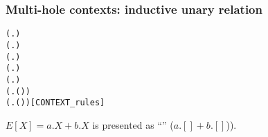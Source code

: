 \begin{frame}[fragile]
\frametitle{Multi-hole contexts: inductive unary relation}
\vspace{-2ex}
\begin{definition}
\begin{small}
\begin{alltt}
 (\HOLTokenLambda{}. )
 (\HOLTokenLambda{}. )
  \HOLSymConst{\HOLTokenImp{}}  (\HOLTokenLambda{}.  )
  \HOLSymConst{\HOLTokenConj{}}   \HOLSymConst{\HOLTokenImp{}}  (\HOLTokenLambda{}.   \HOLSymConst{\ensuremath{+}}  )
  \HOLSymConst{\HOLTokenConj{}}   \HOLSymConst{\HOLTokenImp{}}  (\HOLTokenLambda{}.   \HOLSymConst{\ensuremath{\parallel}}  )
  \HOLSymConst{\HOLTokenImp{}}  (\HOLTokenLambda{}. \HOLSymConst{\ensuremath{\nu}}  ( ))
  \HOLSymConst{\HOLTokenImp{}}  (\HOLTokenLambda{}.  ( ) )\hfill{[CONTEXT_rules]}
\end{alltt}
\end{small}
\end{definition}
\begin{examples}
$E[X] = a.X + b.X$ is presented as ``'' ($a.[] + b.[]$)).
\end{examples}
\end{frame}

